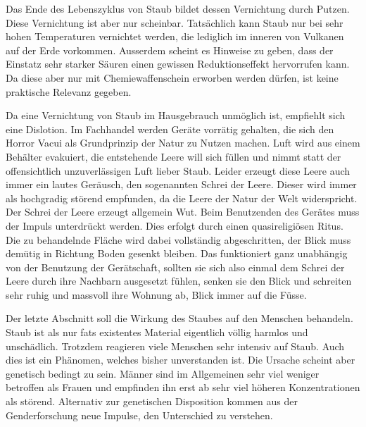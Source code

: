 Das Ende des Lebenszyklus von Staub bildet dessen Vernichtung durch Putzen. Diese Vernichtung ist aber nur scheinbar. Tatsächlich kann Staub nur bei sehr hohen Temperaturen vernichtet werden, die lediglich im inneren von Vulkanen auf der Erde vorkommen. Ausserdem scheint es Hinweise zu geben, dass der Einstatz sehr starker Säuren einen gewissen Reduktionseffekt hervorrufen kann. Da diese aber nur mit Chemiewaffenschein erworben werden dürfen, ist keine praktische Relevanz gegeben.

Da eine Vernichtung von Staub im Hausgebrauch unmöglich ist, empfiehlt sich eine Dislotion. Im Fachhandel werden Geräte vorrätig gehalten, die sich den Horror Vacui als Grundprinzip der Natur zu Nutzen machen. Luft wird aus einem Behälter evakuiert, die entstehende Leere will sich füllen und nimmt statt der offensichtlich unzuverlässigen Luft lieber Staub. Leider erzeugt diese Leere auch immer ein lautes Geräusch, den sogenannten Schrei der Leere. Dieser wird immer als hochgradig störend empfunden, da die Leere der Natur der Welt widerspricht. Der Schrei der Leere erzeugt allgemein Wut. Beim Benutzenden des Gerätes muss der Impuls unterdrückt werden. Dies erfolgt durch einen quasireligiösen Ritus. Die zu behandelnde Fläche wird dabei vollständig abgeschritten, der Blick muss demütig in Richtung Boden gesenkt bleiben. Das funktioniert ganz unabhängig von der Benutzung der Gerätschaft, sollten sie sich also einmal dem Schrei der Leere durch ihre Nachbarn ausgesetzt fühlen, senken sie den Blick und schreiten sehr ruhig und massvoll ihre Wohnung ab, Blick immer auf die Füsse.

Der letzte Abschnitt soll die Wirkung des Staubes auf den Menschen behandeln. Staub ist als nur fats existentes Material eigentlich völlig harmlos und unschädlich. Trotzdem reagieren viele Menschen sehr intensiv auf Staub. Auch dies ist ein Phänomen, welches bisher unverstanden ist. Die Ursache scheint aber genetisch bedingt zu sein. Männer sind im Allgemeinen sehr viel weniger betroffen als Frauen und empfinden ihn erst ab sehr viel höheren Konzentrationen als störend. Alternativ zur genetischen Disposition kommen aus der Genderforschung neue Impulse, den Unterschied zu verstehen. 
\vfill
